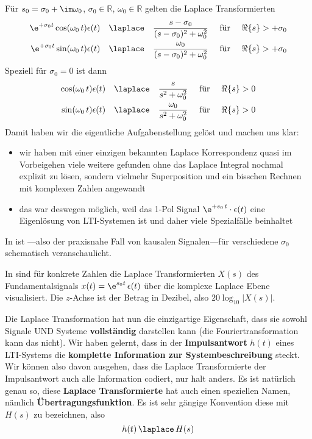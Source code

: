 \begin{Loesung}
Für $s_0=\sigma_0 + \im \omega_0$,
$\sigma_0\in\mathbb{R}$,
$\omega_0\in\mathbb{R}$
gelten die Laplace Transformierten
\begin{align}
\label{eq:31AEFEF90B}
\e^{+\sigma_0 t} \cos(\omega_0 \, t) \epsilon(t)
\quad \laplace \quad
\frac{s-\sigma_0}{(s-\sigma_0)^2+\omega_0^2}
\quad\text{ für } \quad\Re\{s\} >  +\sigma_0
\\
\e^{+\sigma_0 t} \sin(\omega_0 \, t) \epsilon(t)
\quad \laplace \quad
\frac{\omega_0}{(s-\sigma_0)^2+\omega_0^2}
\quad\text{ für } \quad\Re\{s\} >  +\sigma_0
\end{align}
Speziell für $\sigma_0=0$ ist dann
\begin{align}
\cos(\omega_0 \, t) \epsilon(t)
\quad \laplace \quad
\frac{s}{s^2+\omega_0^2}
\quad\text{ für } \quad\Re\{s\} > 0
\\
\sin(\omega_0 \, t) \epsilon(t)
\quad \laplace \quad
\frac{\omega_0}{s^2+\omega_0^2}
\quad\text{ für } \quad\Re\{s\} > 0
\end{align}
%
Damit haben wir die eigentliche Aufgabenstellung gelöst und machen uns klar:
\begin{itemize}
\item wir haben mit einer einzigen bekannten Laplace Korrespondenz
quasi im Vorbeigehen viele weitere gefunden
ohne das Laplace Integral nochmal explizit zu lösen, sondern vielmehr Superposition
und ein bisschen Rechnen mit komplexen Zahlen angewandt
\item das war deswegen möglich, weil das 1-Pol Signal
$\e^{+s_0 \, t} \cdot \epsilon(t)$ eine Eigenlösung von LTI-Systemen ist und
daher viele Spezialfälle beinhaltet
\end{itemize}

In  ist ---also der praxisnahe Fall von
kausalen Signalen---für verschiedene $\sigma_0$ schematisch veranschaulicht.

In  sind für konkrete Zahlen die Laplace
Transformierten $X(s)$ des Fundamentalsignals $x(t)=\e^{s_0 t}\,\epsilon(t)$
über die komplexe Laplace Ebene visualisiert.
Die $z$-Achse ist der Betrag in Dezibel, also
$20 \log_{10}|X(s)|$.

\textbf{}
Die Laplace Transformation hat nun die einzigartige Eigenschaft, dass sie
sowohl Signale UND Systeme \textbf{vollständig} darstellen kann
(die Fouriertransformation kann das nicht).
%
Wir haben gelernt, dass in der \textbf{Impulsantwort} $h(t)$ eines LTI-Systems die
\textbf{komplette Information zur Systembeschreibung} steckt.
%
Wir können also davon ausgehen, dass die Laplace Transformierte der Impulsantwort
auch alle Information codiert, nur halt anders. Es ist natürlich genau so, diese
\textbf{Laplace Transformierte} hat auch einen speziellen Namen, nämlich
\textbf{Übertragungsfunktion}.
Es ist sehr gängige Konvention diese mit $H(s)$ zu bezeichnen, also
\begin{equation}
h(t) \, \laplace \, H(s)
\end{equation}
%


\end{Loesung}
